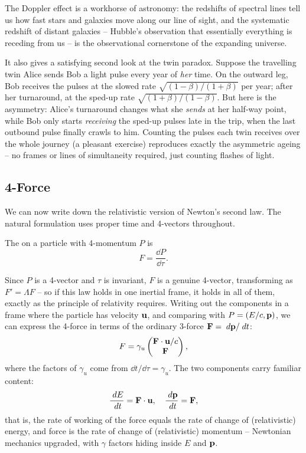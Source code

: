 \documentclass[a4paper]{scrartcl}
\begin{document}
The Doppler effect is a workhorse of astronomy: the redshifts of spectral lines tell us how fast stars and galaxies move along our line of sight, and the systematic redshift of distant galaxies -- Hubble's observation that essentially everything is receding from us -- is the observational cornerstone of the expanding universe.

It also gives a satisfying second look at the twin paradox. Suppose the travelling twin Alice sends Bob a light pulse every year of \emph{her} time. On the outward leg, Bob receives the pulses at the slowed rate $\sqrt{(1-\beta)/(1+\beta)}$ per year; after her turnaround, at the sped-up rate $\sqrt{(1+\beta)/(1-\beta)}$. But here is the asymmetry: Alice's turnaround changes what she \emph{sends} at her half-way point, while Bob only starts \emph{receiving} the sped-up pulses late in the trip, when the last outbound pulse finally crawls to him. Counting the pulses each twin receives over the whole journey (a pleasant exercise) reproduces exactly the asymmetric ageing -- no frames or lines of simultaneity required, just counting flashes of light.

\subsection{4-Force}

We can now write down the relativistic version of Newton's second law. The natural formulation uses proper time and 4-vectors throughout.

\begin{definition}[4-Force]
	The  on a particle with 4-momentum $P$ is
	$$
	F = \frac{\dd P}{\dd\tau}.
	$$
\end{definition}

Since $P$ is a 4-vector and $\tau$ is invariant, $F$ is a genuine 4-vector, transforming as $F' = \Lambda F$ -- so if this law holds in one inertial frame, it holds in all of them, exactly as the principle of relativity requires. Writing out the components in a frame where the particle has velocity $\mathbf{u}$, and comparing with $P = (E/c, \mathbf{p})$, we can express the 4-force in terms of the ordinary 3-force $\mathbf{F} = \; d\mathbf{p}/\; d t$:
$$
F = \gamma_u \begin{pmatrix}
	\mathbf{F} \cdot \mathbf{u} / c \\
	\mathbf{F}
\end{pmatrix},
$$
where the factors of $\gamma_u$ come from $\dd t/\dd\tau = \gamma_u$. The two components carry familiar content:
$$
\frac{\; d E}{\; d t} = \mathbf{F} \cdot \mathbf{u}, \quad \frac{\; d \mathbf{p}}{\; d t} = \mathbf{F},
$$
that is, the rate of working of the force equals the rate of change of (relativistic) energy, and force is the rate of change of (relativistic) momentum -- Newtonian mechanics upgraded, with $\gamma$ factors hiding inside $E$ and $\mathbf{p}$.
\end{document}

